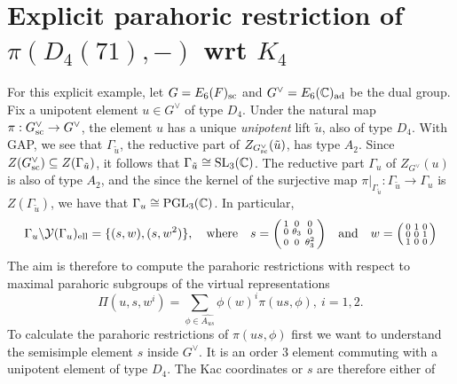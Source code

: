 
\section{Explicit parahoric restriction of \texorpdfstring{$\pi(D_4(71),-)$}{PDFstring} wrt \texorpdfstring{$K_4$}{PDFstring}}

For this explicit example, let $G=E_6(F)_{\mathrm{sc}}$ and $G^\vee=E_6(\mathbb{C})_{\mathrm{ad}}$ be the dual group. Fix a unipotent element $u\in G^\vee$ of type $D_4$. Under the natural map $\pi:G^\vee_{\mathrm{sc}}\rightarrow G^\vee$, the element $u$ has a unique \textit{unipotent} lift $\tilde{u}$, also of type $D_4$. With GAP, we see that $\Gamma_{\tilde{u}}$, the reductive part of $Z_{G^\vee_{\mathrm{sc}}}(\tilde{u})$, has type $A_2$. Since $Z(G^\vee_{\mathrm{sc}})\subseteq Z(\Gamma_{\tilde{u}})$, it follows that $\Gamma_{\tilde{u}}\cong\mathrm{SL}_3(\mathbb{C})$. The reductive part $\Gamma_u$ of $Z_{G^\vee}(u)$ is also of type $A_2$, and the since the kernel of the surjective map $\pi|_{\Gamma_{\tilde{u}}}:\Gamma_{\tilde{u}}\rightarrow\Gamma_u$ is $Z(\Gamma_{\tilde{u}})$, we have that $\Gamma_u\cong\mathrm{PGL}_3(\mathbb{C})$. In particular, 
$$\Gamma_u\backslash\mathcal{Y}(\Gamma_u)_{\mathrm{ell}}=\{(s,w),(s,w^2)\}, \quad\text{where}\quad s=\begin{psmallmatrix}
    1 & 0 & 0\\
    0 & \theta_3 & 0\\
    0 & 0 & \theta_3^2
\end{psmallmatrix}\quad\text{and}\quad w=\begin{psmallmatrix}
    0 & 1 & 0\\
    0 & 0 & 1\\
    1 & 0 & 0
\end{psmallmatrix}$$
The aim is therefore to compute the parahoric restrictions with respect to maximal parahoric subgroups of the virtual representations
$$\Pi(u,s,w^i)=\sum_{\phi\in\widehat{A_{us}}}\phi(w)^i\pi(us,\phi),\ i=1,2.$$
To calculate the parahoric restrictions of $\pi(us,\phi)$ first we want to understand the semisimple element $s$ inside $G^\vee$. It is an order $3$ element commuting with a unipotent element of type $D_4$. The Kac coordinates or $s$ are therefore either of 

